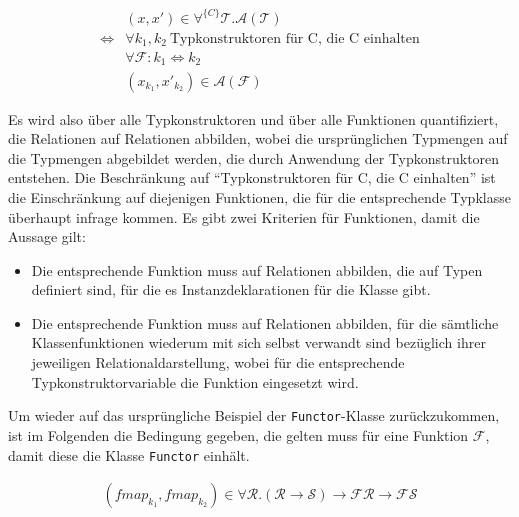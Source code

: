 \begin{align*}
& (x, x') \in \forall^{\{C\}} \mathcal{T} . \mathcal{A}(\mathcal{T}) \\
\Leftrightarrow & \forall k_1, k_2~\text{Typkonstruktoren für C, die C einhalten}\\
& \forall \mathcal{F} : k_1 \Leftrightarrow k_2 \\
& (x_{k_1}, x'_{k_2}) \in \mathcal{A}(\mathcal{F})
\end{align*}

Es wird also über alle Typkonstruktoren und über alle Funktionen quantifiziert, die Relationen auf Relationen abbilden, wobei die
ursprünglichen Typmengen auf die Typmengen abgebildet werden, die durch Anwendung der Typkonstruktoren entstehen.
Die Beschränkung auf ``Typkonstruktoren für C, die C einhalten'' ist die Einschränkung auf diejenigen Funktionen, die für die
entsprechende Typklasse überhaupt infrage kommen. Es gibt zwei Kriterien für Funktionen, damit die Aussage gilt:

\begin{itemize}
\item Die entsprechende Funktion muss auf Relationen abbilden, die auf Typen definiert sind, für die es Instanzdeklarationen
für die Klasse gibt.
\item Die entsprechende Funktion muss auf Relationen abbilden, für die sämtliche Klassenfunktionen wiederum mit sich selbst
verwandt sind bezüglich ihrer jeweiligen Relationaldarstellung, wobei für die entsprechende Typkonstruktorvariable die Funktion
eingesetzt wird.
\end{itemize}

Um wieder auf das ursprüngliche Beispiel der \texttt{Functor}-Klasse zurückzukommen, ist im Folgenden die Bedingung gegeben,
die gelten muss für eine Funktion $\mathcal{F}$, damit diese die Klasse \texttt{Functor} einhält.

\begin{align*}
(fmap_{k_1}, fmap_{k_2}) \in \forall \mathcal{R} . (\mathcal{R} \rightarrow \mathcal{S}) \rightarrow \mathcal{F} \mathcal{R}
\rightarrow \mathcal{F} \mathcal{S}
\end{align*}

